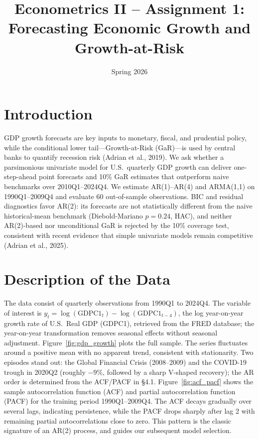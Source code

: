 \documentclass[12pt]{article}
\title{Econometrics II -- Assignment 1:\\
Forecasting Economic Growth and Growth-at-Risk}
\date{Spring 2026}
\begin{document}
\maketitle

\section{Introduction}

GDP growth forecasts are key inputs to monetary, fiscal, and prudential policy, while the conditional lower tail---Growth-at-Risk (GaR)---is used by central banks to quantify recession risk (Adrian et al., 2019).
We ask whether a parsimonious univariate model for U.S.\ quarterly GDP growth can deliver one-step-ahead point forecasts and 10\% GaR estimates that outperform naive benchmarks over 2010Q1--2024Q4.
We estimate AR(1)--AR(4) and ARMA(1,1) on 1990Q1--2009Q4 and evaluate 60 out-of-sample observations.
\newline
\newline
BIC and residual diagnostics favor AR(2): its forecasts are not statistically different from the naive historical-mean benchmark (Diebold-Mariano $p=0.24$, HAC), and neither AR(2)-based nor unconditional GaR is rejected by the 10\% coverage test, consistent with recent evidence that simple univariate models remain competitive (Adrian et al., 2025).




\section{Description of the Data}

The data consist of quarterly observations from 1990Q1 to 2024Q4. The variable of interest is $y_t = \log(\text{GDPC1}_t) - \log(\text{GDPC1}_{t-4})$, the log year-on-year growth rate of U.S.\ Real GDP (GDPC1), retrieved from the FRED database; the year-on-year transformation removes seasonal effects without seasonal adjustment.
\newline
Figure~\ref{fig:gdp_growth} plots the full sample. The series fluctuates around a positive mean with no apparent trend, consistent with stationarity. Two episodes stand out: the Global Financial Crisis (2008--2009) and the COVID-19 trough in 2020Q2 (roughly $-9\%$, followed by a sharp V-shaped recovery); the AR order is determined from the ACF/PACF in \S4.1.
\newline
Figure~\ref{fig:acf_pacf} shows the sample autocorrelation function (ACF) and partial autocorrelation function (PACF) for the training period 1990Q1--2009Q4. The ACF decays gradually over several lags, indicating persistence, while the PACF drops sharply after lag 2 with remaining partial autocorrelations close to zero. This pattern is the classic signature of an AR(2) process, and guides our subsequent model selection.
\end{document}

